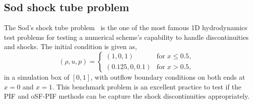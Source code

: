 \subsection{Sod shock tube problem}\label{subsec:sod}

The Sod's shock tube problem~\cite{sod1978survey} is the one of the most famous 1D hydrodynamics
test problems for testing a numerical scheme's capability to handle discontinuities and shocks.
The initial condition is given as,
\begin{equation}\label{eq:sod_init}
    \left( \rho, u, p \right) = \begin{cases}
        \left( 1, 0, 1 \right) & \text{for } x \le 0.5, \\
        \left( 0.125, 0, 0.1 \right) & \text{for } x > 0.5,
    \end{cases}
\end{equation}
in a simulation box of \( [0, 1] \), with outflow boundary conditions
on both ends at \( x = 0 \) and \( x = 1 \).
This benchmark problem is an excellent practice to
test if the PIF and oSF-PIF methods can be capture the shock discontinuities
appropriately.

